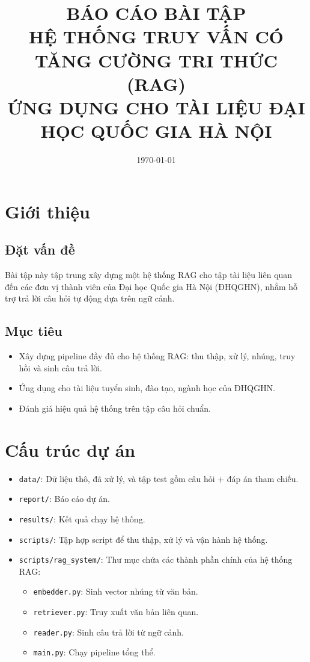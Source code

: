\documentclass[12pt]{article}
\title{BÁO CÁO BÀI TẬP\\HỆ THỐNG TRUY VẤN CÓ TĂNG CƯỜNG TRI THỨC (RAG)\\ỨNG DỤNG CHO TÀI LIỆU ĐẠI HỌC QUỐC GIA HÀ NỘI}
\date{\today}
\begin{document}
\maketitle

\tableofcontents
\newpage

\section{Giới thiệu}
\subsection{Đặt vấn đề}
Bài tập  này tập trung xây dựng một hệ thống RAG cho tập tài liệu liên quan đến các đơn vị thành viên của Đại học Quốc gia Hà Nội (ĐHQGHN), nhằm hỗ trợ trả lời câu hỏi tự động dựa trên ngữ cảnh.

\subsection{Mục tiêu}
\begin{itemize}
    \item Xây dựng pipeline đầy đủ cho hệ thống RAG: thu thập, xử lý, nhúng, truy hồi và sinh câu trả lời.
    \item Ứng dụng cho tài liệu tuyển sinh, đào tạo, ngành học của ĐHQGHN.
    \item Đánh giá hiệu quả hệ thống trên tập câu hỏi chuẩn.
\end{itemize}

\section{Cấu trúc dự án}
\begin{itemize}
    \item \texttt{data/}: Dữ liệu thô, đã xử lý, và tập test gồm câu hỏi + đáp án tham chiếu.
    \item \texttt{report/}: Báo cáo dự án.
    \item \texttt{results/}: Kết quả chạy hệ thống.
    \item \texttt{scripts/}: Tập hợp script để thu thập, xử lý và vận hành hệ thống.
    \item \texttt{scripts/rag\_system/}: Thư mục chứa các thành phần chính của hệ thống RAG:
    \begin{itemize}
        \item \texttt{embedder.py}: Sinh vector nhúng từ văn bản.
        \item \texttt{retriever.py}: Truy xuất văn bản liên quan.
        \item \texttt{reader.py}: Sinh câu trả lời từ ngữ cảnh.
        \item \texttt{main.py}: Chạy pipeline tổng thể.
    \end{itemize}
\end{itemize}
\end{document}
